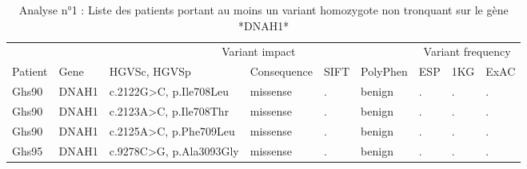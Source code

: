 \documentclass[12pt,twoside]{reedthesis}
\theoremstyle{definition}
\theoremstyle{definition}
\theoremstyle{remark}
\begin{document}
  \begin{landscape}
  \begin{longtable}[t]{lllllllll}
  \caption{\label{tab:tabdnah1moderate}Analyse n°1 : Liste des patients portant au moins un variant homozygote non tronquant sur le gène *DNAH1*}\\
  \toprule
  \multicolumn{1}{c}{ } & \multicolumn{1}{c}{ } & \multicolumn{4}{c}{Variant impact} & \multicolumn{3}{c}{Variant frequency} \\
  \cmidrule(l{2pt}r{2pt}){3-6} \cmidrule(l{2pt}r{2pt}){7-9}
  Patient & Gene & HGVSc, HGVSp & Consequence & SIFT & PolyPhen & ESP & 1KG & ExAC\\
  \midrule
  Ghs90 & DNAH1 & c.2122G>C, p.Ile708Leu & missense & . & benign & . & . & .\\
  Ghs90 & DNAH1 & c.2123A>C, p.Ile708Thr & missense & . & benign & . & . & .\\
  Ghs90 & DNAH1 & c.2125A>C, p.Phe709Leu & missense & . & benign & . & . & .\\
  Ghs95 & DNAH1 & c.9278C>G, p.Ala3093Gly & missense & . & benign & . & . & .\\
  \bottomrule
  \end{longtable}
  \end{landscape}
  
  \newpage
  
\end{document}
